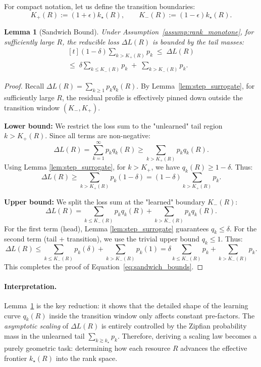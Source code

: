 \documentclass{article}
\theoremstyle{plain}
\newtheorem{lemma}[theorem]{Lemma}
\theoremstyle{definition}
\theoremstyle{remark}
\begin{document}
For compact notation, let us define the transition boundaries:
\[
K_{+}(R):=(1+\epsilon)k_\star(R),\qquad K_{-}(R):=(1-\epsilon)k_\star(R).
\]

\begin{lemma}[Sandwich Bound]
\label{lem:sandwich}
Under Assumption~\ref{assump:rank_monotone}, for sufficiently large $R$, the reducible loss $\Delta L(R)$ is bounded by the tail masses:
\begin{equation}
\label{eq:sandwich_bounds}
\begin{multlined}[t]
(1-\delta)\sum_{k>K_{+}(R)} p_k \;\le\; \Delta L(R) \\
\le\; \delta\sum_{k\le K_{-}(R)} p_k \;+\; \sum_{k>K_{-}(R)} p_k .
\end{multlined}
\end{equation}
\end{lemma}

\begin{proof}
Recall $\Delta L(R)=\sum_{k\ge 1} p_k q_k(R)$.
By Lemma~\ref{lem:step_surrogate}, for sufficiently large $R$, the residual profile is effectively pinned down outside the transition window $(K_-, K_+)$.

\textbf{Lower bound:}
We restrict the loss sum to the "unlearned" tail region $k > K_{+}(R)$. Since all terms are non-negative:
\[
\Delta L(R) = \sum_{k=1}^\infty p_k q_k(R) \ge \sum_{k>K_{+}(R)} p_k q_k(R).
\]
Using Lemma \ref{lem:step_surrogate}, for $k > K_+$, we have $q_k(R) \ge 1-\delta$. Thus:
\[
\Delta L(R) \ge \sum_{k>K_{+}(R)} p_k (1-\delta) = (1-\delta)\sum_{k>K_{+}(R)} p_k.
\]

\textbf{Upper bound:}
We split the loss sum at the "learned" boundary $K_{-}(R)$:
\[
\Delta L(R) = \sum_{k\le K_{-}(R)} p_k q_k(R) + \sum_{k>K_{-}(R)} p_k q_k(R).
\]
For the first term (head), Lemma \ref{lem:step_surrogate} guarantees $q_k \le \delta$. For the second term (tail + transition), we use the trivial upper bound $q_k \le 1$. Thus:
\[
\Delta L(R) \le \sum_{k\le K_{-}(R)} p_k (\delta) + \sum_{k>K_{-}(R)} p_k (1) = \delta\sum_{k\le K_{-}(R)} p_k + \sum_{k>K_{-}(R)} p_k.
\]
This completes the proof of Equation~\eqref{eq:sandwich_bounds}.
\end{proof}

\paragraph{Interpretation.}
Lemma~\ref{lem:sandwich} is the key reduction: it shows that the detailed shape of the learning curve $q_k(R)$ inside the transition window only affects constant pre-factors. The \emph{asymptotic scaling} of $\Delta L(R)$ is entirely controlled by the Zipfian probability mass in the unlearned tail $\sum_{k \gtrsim k_\star} p_k$. Therefore, deriving a scaling law becomes a purely geometric task: determining how each resource $R$ advances the effective frontier $k_\star(R)$ into the rank space.
\end{document}
